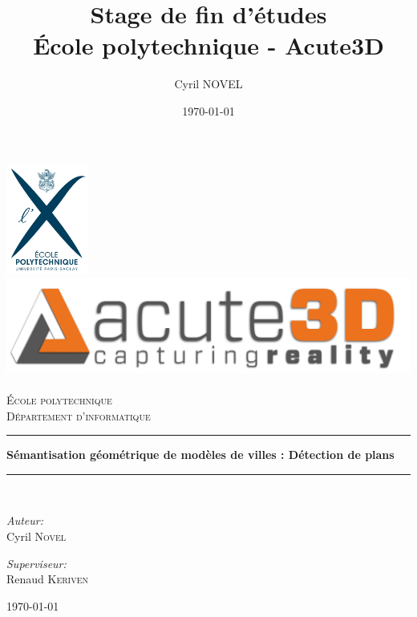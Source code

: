 \documentclass[12pt, twoside]{article}
\title{Stage de fin d'études\\
\large{École polytechnique - Acute3D}}
\author{Cyril NOVEL}
\date{\today}
\begin{document}
\begin{titlepage}
\begin{center}
\includegraphics[width=0.20\textwidth]{LogoX.jpg}~\\[0.5cm]
\includegraphics[height=0.12\textwidth]{LogoA3D.jpg}~\\[1cm]

\textsc{\LARGE École polytechnique}\\[0.5cm]

\textsc{\Large Département d'informatique}\\[1.5cm]

\rule{\textwidth}{.4pt}
{ \huge \bfseries Sémantisation géométrique de modèles de villes : Détection de plans \\[0.4cm] }

\rule{\textwidth}{.4pt}\\[1.5cm]

\begin{minipage}{0.4\textwidth}
\begin{flushleft} \large
\emph{Auteur:}\\
Cyril \textsc{Novel}
\end{flushleft}
\end{minipage}
\begin{minipage}{0.4\textwidth}
\begin{flushright} \large
\emph{Superviseur:} \\
Renaud \textsc{Keriven}
\end{flushright}
\end{minipage}

\vfill
{\large \today}
\end{center}
\end{titlepage}
\end{document}
